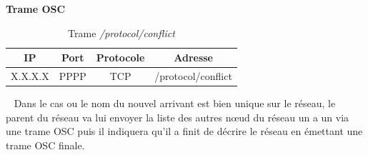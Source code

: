 \begin{table}[htbp]
\centering

\textbf{Trame OSC}\vspace{8pt}~\\

\begin{tabularx}{0.85\textwidth}{|c|c|c|C|}
\hline
\textbf{IP} & \textbf{Port} & \textbf{Protocole} & \textbf{Adresse}  \tabularnewline
\hline
\hline
X.X.X.X\footnotemark[1] & PPPP\footnotemark[2] & TCP & /protocol/conflict \tabularnewline
\hline
\end{tabularx}
\vspace{10pt} 
\label{tab:trame_newhere}
\caption{Trame \textsl{/protocol/conflict}}
\vspace{-25pt}
\end{table}
~\p
Dans le cas ou le nom du nouvel arrivant est bien unique sur le réseau, le parent du réseau va lui envoyer la liste des autres nœud du réseau un a un via une trame OSC puis il indiquera qu'il a finit de décrire le réseau en émettant une trame OSC finale.
\newpage
